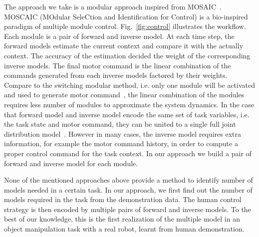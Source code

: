 The approach we take is a modular approach inspired from MOSAIC~\cite{haruno2001mosaic}. MOSCAIC (MOdular SeleCtion and Identification for Control) is a bio-inspired paradigm of multiple module control. Fig.~\ref{fig:control} illustrates the workflow. Each module is a pair of forward and inverse model. At each time step, the forward models estimate the current context and compare it with the actually context. The accuracy of the estimation decided the weight of the corresponding inverse models.
The final motor command is the linear combination of the commands generated from each inverse models factored by their weights. Compare to the switching modular method, i.e. only one module will be activated and used to generate motor command~\cite{narendra1997adaptive}, the linear combination of the modules requires less number of modules to approximate the system dynamics. In the case that forward model and inverse model encode the same set of task variables, i.e. the task state and motor command, they can be united to a single full joint distribution model~\cite{petkos2006learning}. However in many cases, the inverse model requires extra information, for example the motor command history, in order to compute a proper control command for the task context. In our approach we build a pair of forward and inverse model for each module.


None of the mentioned approaches above provide a method to identify number of models needed in a certain task.
In our approach, we first find out the number of models required in the task from the demonstration data. The human control strategy is then encoded by multiple pairs of forward and inverse models.  %
To the best of our knowledge, this is the first realization of the multiple model in an object manipulation task with a real robot, learnt from human demonstration.

%
%
%

